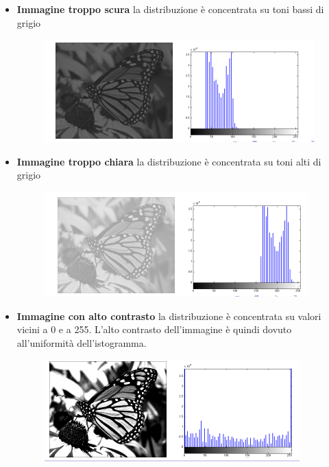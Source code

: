 \begin{itemize}
    \item \textbf{Immagine troppo scura} la distribuzione è concentrata su toni
          bassi di grigio

          \begin{figure}[H]
              \centering
              \includegraphics[width=\linewidth, keepaspectratio]{capitoli/immagini/imgs/isto-scuro.png}
          \end{figure}

    \item \textbf{Immagine troppo chiara} la distribuzione è concentrata su toni
          alti di grigio

          \begin{figure}[H]
              \centering
              \includegraphics[width=\linewidth, keepaspectratio]{capitoli/immagini/imgs/isto-chiaro.png}
          \end{figure}

    \item \textbf{Immagine con alto contrasto} la distribuzione è concentrata su
          valori vicini a 0 e a 255. L'alto contrasto dell'immagine è quindi
          dovuto all'uniformità dell'istogramma.

          \begin{figure}[H]
              \centering
              \includegraphics[width=\linewidth, keepaspectratio]{capitoli/immagini/imgs/alto-c.png}
          \end{figure}
\end{itemize}


